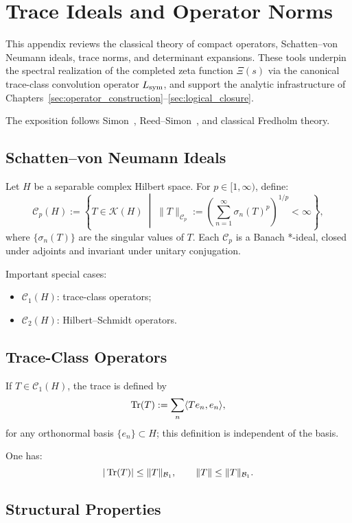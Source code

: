 \section{Trace Ideals and Operator Norms}
\label{app:trace_ideals_review}

This appendix reviews the classical theory of compact operators, Schatten–von Neumann ideals, trace norms, and determinant expansions. These tools underpin the spectral realization of the completed zeta function \( \Xi(s) \) via the canonical trace-class convolution operator \( L_{\mathrm{sym}} \), and support the analytic infrastructure of Chapters~\ref{sec:operator_construction}–\ref{sec:logical_closure}.

The exposition follows Simon~\cite{Simon2005TraceIdeals}, Reed–Simon~\cite{ReedSimon1980I, ReedSimon1975II}, and classical Fredholm theory.

\subsection*{Schatten–von Neumann Ideals}

Let \( H \) be a separable complex Hilbert space. For \( p \in [1, \infty) \), define:
\[
\mathcal{C}_p(H) := \left\{ T \in \mathcal{K}(H) \;\middle|\; \|T\|_{\mathcal{C}_p} := \left( \sum_{n=1}^\infty \sigma_n(T)^p \right)^{1/p} < \infty \right\},
\]
where \( \{ \sigma_n(T) \} \) are the singular values of \( T \). Each \( \mathcal{C}_p \) is a Banach *-ideal, closed under adjoints and invariant under unitary conjugation.

\medskip
\noindent
Important special cases:
\begin{itemize}
  \item \( \mathcal{C}_1(H) \): trace-class operators;
  \item \( \mathcal{C}_2(H) \): Hilbert–Schmidt operators.
\end{itemize}

\subsection*{Trace-Class Operators}

If \( T \in \mathcal{C}_1(H) \), the trace is defined by
\[
\operatorname{Tr}(T) := \sum_n \langle T e_n, e_n \rangle,
\]
for any orthonormal basis \( \{e_n\} \subset H \); this definition is independent of the basis.

One has:
\[
|\operatorname{Tr}(T)| \le \|T\|_{\mathcal{B}_1}, \qquad \|T\| \le \|T\|_{\mathcal{B}_1}.
\]

\subsection*{Structural Properties}

